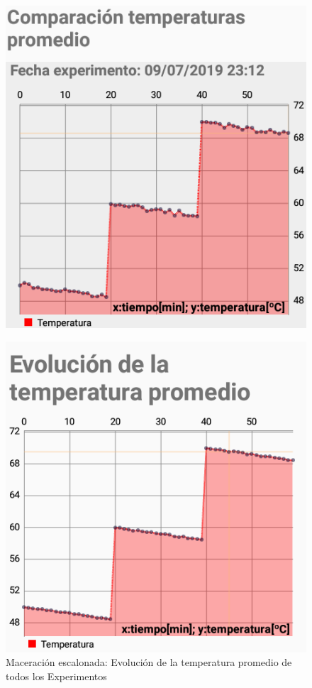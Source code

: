             \begin{figure}[H]    
                \centering
                \includegraphics[scale=0.65]{Pruebas/EscalonadaExp3.jpg}
                \label{fig:EscExp3}
            \end{figure}

            \begin{figure}[H]
                \centering
                \includegraphics[scale=0.65]{Pruebas/EscalonadaEvolTempProm.jpg}
                \caption{Maceración escalonada: Evolución de la temperatura promedio de todos los Experimentos}
                \label{fig:EscTempProm}
            \end{figure}
        
